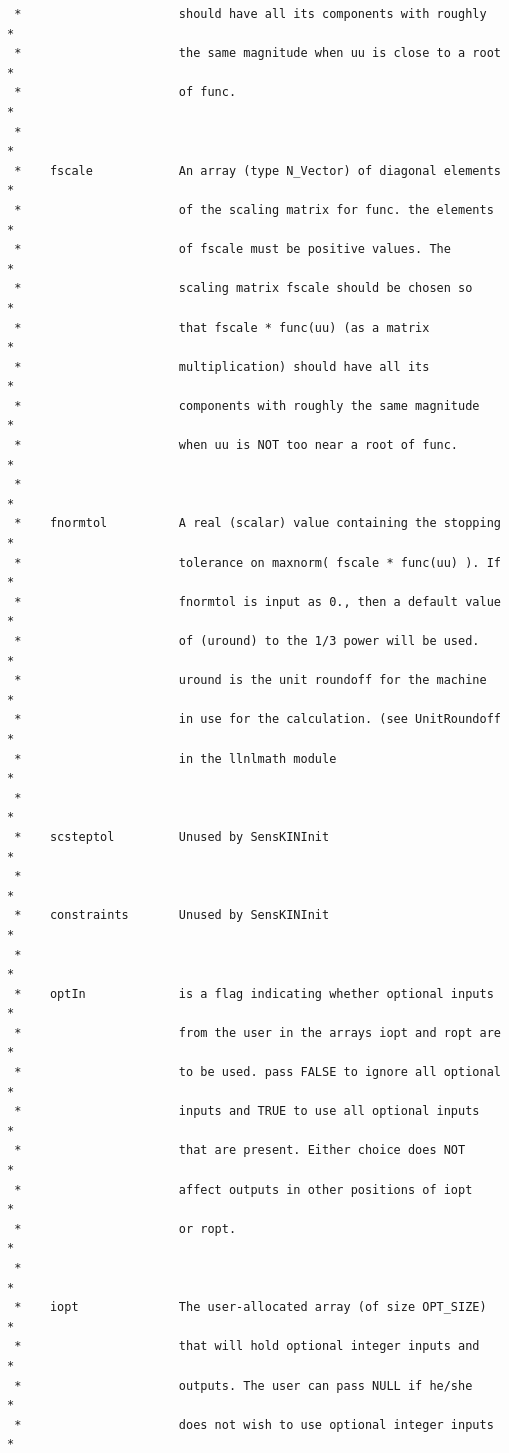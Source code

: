 \documentclass[11pt]{article}
\begin{document}
\begin{verbatim}
 *                      should have all its components with roughly   *
 *                      the same magnitude when uu is close to a root *
 *                      of func.                                      *
 *                                                                    *
 *    fscale            An array (type N_Vector) of diagonal elements *
 *                      of the scaling matrix for func. the elements  *
 *                      of fscale must be positive values. The        *
 *                      scaling matrix fscale should be chosen so     *
 *                      that fscale * func(uu) (as a matrix           *
 *                      multiplication) should have all its           *
 *                      components with roughly the same magnitude    *
 *                      when uu is NOT too near a root of func.       *
 *                                                                    *
 *    fnormtol          A real (scalar) value containing the stopping *
 *                      tolerance on maxnorm( fscale * func(uu) ). If *
 *                      fnormtol is input as 0., then a default value *
 *                      of (uround) to the 1/3 power will be used.    *
 *                      uround is the unit roundoff for the machine   *
 *                      in use for the calculation. (see UnitRoundoff *
 *                      in the llnlmath module                        *
 *                                                                    *
 *    scsteptol         Unused by SensKINInit                         *
 *                                                                    *
 *    constraints       Unused by SensKINInit                         *
 *                                                                    *
 *    optIn             is a flag indicating whether optional inputs  *
 *                      from the user in the arrays iopt and ropt are *
 *                      to be used. pass FALSE to ignore all optional *
 *                      inputs and TRUE to use all optional inputs    *
 *                      that are present. Either choice does NOT      *
 *                      affect outputs in other positions of iopt     *
 *                      or ropt.                                      *
 *                                                                    *
 *    iopt              The user-allocated array (of size OPT_SIZE)   *
 *                      that will hold optional integer inputs and    *
 *                      outputs. The user can pass NULL if he/she     *
 *                      does not wish to use optional integer inputs  *

\end{verbatim}
\end{document}
